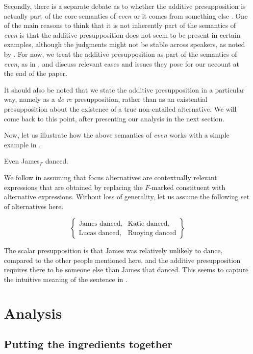 \documentclass[output=paper]{langscibook}
\begin{document}
Secondly, there is a separate debate as to whether the additive presupposition is actually part of the core semantics of \textit{even} or it  comes from something else \citep{rullmann, crnic, francis}. One of the main reasons to think that it is not inherently part of the semantics of \textit{even} is that the additive presupposition does not seem to be present in certain examples, although the judgments might not be stable across speakers, as noted by \citet{francis}. For now, we treat the additive presupposition as part of the semantics of \textit{even}, as in , and discuss relevant cases and issues they pose for our account at the end of the paper.

It should also be noted that we state the additive presupposition in a particular way, namely as a \textit{de re} presupposition, rather than as an existential presupposition about the existence of a true non-entailed alternative. We will come back to this point, after presenting our analysis in the next section.

Now, let us illustrate how the above semantics of \textit{even} works with a simple example in .

    \ea Even James$_F$ danced.\label{don-sud:dance}
    \z

\noindent We follow \citet{foxkatzir} in assuming that focus alternatives are contextually relevant expressions that are obtained by replacing the $F$-marked constituent with alternative expressions. Without loss of generality, let us assume the following set of alternatives here.

     \[\left\{\begin{array}{lll}
    \text{James danced}, & \text{Katie danced},\\
    \text{Lucas danced}, & \text{Ruoying danced}
    \end{array}\right\}\]

\noindent The scalar presupposition is that James was relatively unlikely to dance, compared to the other people mentioned here, and the additive presupposition requires there to be someone else than James that danced. This seems to capture the intuitive meaning of the sentence in .


\section{Analysis}
\label{don-sud:sec:analysis}

\subsection{Putting the ingredients together}
\end{document}
